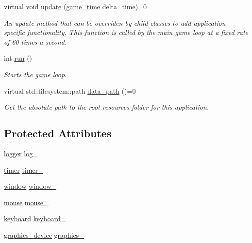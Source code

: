 \begin{DoxyCompactItemize}
virtual void \mbox{\hyperlink{classmoka_1_1application_ab4c9190d4ffa3cdef1b184cac5b02b15}{update}} (\mbox{\hyperlink{namespacemoka_a4b8e94fbfa287169990f1cc8171c0984}{game\+\_\+time}} delta\+\_\+time)=0
\begin{DoxyCompactList}\small\item\em An update method that can be overriden by child classes to add application-\/specific functionality. This function is called by the main game loop at a fixed rate of 60 times a second. \end{DoxyCompactList}\item 
int \mbox{\hyperlink{classmoka_1_1application_a14965b715fe146c3253a7fbdf53a9a98}{run}} ()
\begin{DoxyCompactList}\small\item\em Starts the game loop. \end{DoxyCompactList}\item 
virtual std\+::filesystem\+::path \mbox{\hyperlink{classmoka_1_1application_a8d1863a783aa5727af9612d56043118b}{data\+\_\+path}} ()=0
\begin{DoxyCompactList}\small\item\em Get the absolute path to the root resources folder for this application. \end{DoxyCompactList}\end{DoxyCompactItemize}
\subsection*{Protected Attributes}
\begin{DoxyCompactItemize}
\item 
\mbox{\hyperlink{classmoka_1_1logger}{logger}} \mbox{\hyperlink{classmoka_1_1application_a4c0a7386e9592e03cf892e727773bf18}{log\+\_\+}}
\item 
\mbox{\hyperlink{classmoka_1_1timer}{timer}} \mbox{\hyperlink{classmoka_1_1application_af888f59aa879423973a53500a4c12e1f}{timer\+\_\+}}
\item 
\mbox{\hyperlink{classmoka_1_1window}{window}} \mbox{\hyperlink{classmoka_1_1application_a13c9e8af519e045299e8993a0a928731}{window\+\_\+}}
\item 
\mbox{\hyperlink{classmoka_1_1mouse}{mouse}} \mbox{\hyperlink{classmoka_1_1application_a0723c3d9d05b50e59fc67e523e64e831}{mouse\+\_\+}}
\item 
\mbox{\hyperlink{classmoka_1_1keyboard}{keyboard}} \mbox{\hyperlink{classmoka_1_1application_ad7d5ace0349f00fb9df3760f61035ed8}{keyboard\+\_\+}}
\item 
\mbox{\hyperlink{classmoka_1_1graphics__device}{graphics\+\_\+device}} \mbox{\hyperlink{classmoka_1_1application_a9b6a8978832111b4e8e23c57042396ba}{graphics\+\_\+}}
\end{DoxyCompactItemize}


